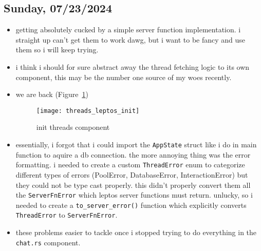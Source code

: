 \subsection*{Sunday, 07/23/2024}
\begin{itemize}
    \item getting absolutely cucked by a simple server function implementation.
        i straight up can't get them to work dawg, but i want to be fancy and
        use them so i will keep trying.
    \item i think i should for sure abstract away the thread fetching logic to
        its own component, this may be the number one source of my woes
        recently.
    \item we are back (Figure~\ref{fig:threads_leptos_init})
        \begin{figure}[ht]
            \centering
            \texttt{[image: threads\_leptos\_init]}
            \captionsetup{labelfont=bf, textfont=it}
            \caption{init threads component}
            \label{fig:threads_leptos_init}
        \end{figure}
    \item essentially, i forgot that i could import the \texttt{AppState} 
        struct like i do in main function to aquire a db connection. the more 
        annoying thing was the error formatting. i needed to create a custom 
        \texttt{ThreadError} enum to
        categorize different types of errors (PoolError, DatabaseError,
        InteractionError) but they could not be type cast properly. this didn't
        properly convert them all the \texttt{ServerFnError} which leptos server
        functions must return. unlucky, so i needed to create a
        \texttt{to_server_error()} function which explicitly converts
        \texttt{ThreadError} to \texttt{ServerFnError}.
    \item these problems easier to tackle once i stopped trying to do everything
        in the \texttt{chat.rs} component.
\end{itemize}

